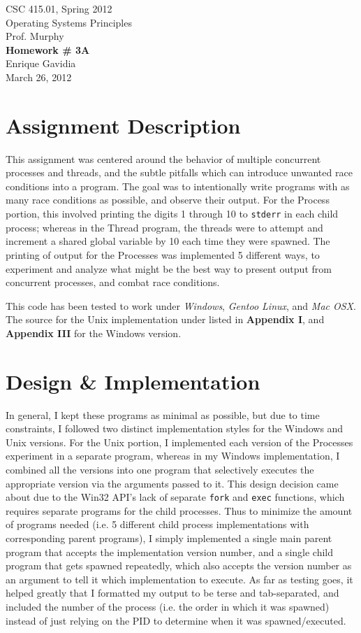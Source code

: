 \documentclass[12pt]{article}
\def \name       {Enrique Gavidia}
\def \coursenum  {CSC 415.01}
\def \coursename {Operating Systems Principles}
\def \instructor {Prof. Murphy}
\def \semester   {Spring 2012}
\def \assignment {Homework \# 3A}
\def \duedate    {March 26, 2012}
\newcommand {\makecover} {
  \begin{titlepage}
    \begin{center}
      \LARGE{\coursenum, \semester \\ \coursename}\\
      \Large{\instructor}\\
      \vfill
      \textbf{\Huge \assignment}\\
      \vfill
      \Large{\name}\\
      \large{\duedate}
    \end{center}
  \end{titlepage}
}
\begin{document}
\makecover

\section*{Assignment Description}
This assignment was centered around the behavior of multiple concurrent processes and threads, and the subtle pitfalls which can introduce
unwanted race conditions into a program. The goal was to intentionally write programs with as many race conditions as possible, and observe
their output. For the Process portion, this involved printing the digits 1 through 10 to \texttt{stderr} in each child process; whereas in
the Thread program, the threads were to attempt and increment a shared global variable by 10 each time they were spawned. The printing of 
output for the Processes was implemented 5 different ways, to experiment and analyze what might be the best way to present output from
concurrent processes, and combat race conditions.

This code has been tested to work under \textsl{Windows}, \textsl{Gentoo Linux}, and \textsl{Mac OSX}.
The source for the Unix implementation under listed in \textbf{Appendix I}, and \textbf{Appendix III} for the Windows version.

\section*{Design \& Implementation}
In general, I kept these programs as minimal as possible, but due to time constraints, I followed two distinct implementation styles for the 
Windows and Unix versions. For the Unix portion, I implemented each version of the Processes experiment in a separate program,
whereas in my Windows implementation, I combined all the versions into one program that selectively executes the appropriate version via the
arguments passed to it.  This design decision came about due to the Win32 API's lack of separate \texttt{fork} and \texttt{exec} functions,
which requires separate programs for the child processes. Thus to minimize the amount of programs needed (i.e. 5 different child process implementations
with corresponding parent programs), I simply implemented a single main parent program that accepts the implementation version number, and a single child 
program that gets spawned repeatedly, which also accepts the version number as an argument to tell it which implementation to execute.  As far as testing
goes, it helped greatly that I formatted my output to be terse and tab-separated, and included the number of the process (i.e. the order in which it was
spawned) instead of just relying on the PID to determine when it was spawned/executed.
\end{document}
